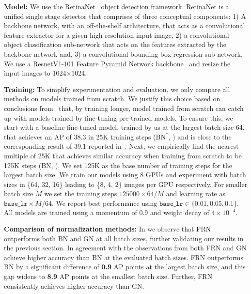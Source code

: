 \documentclass[10pt,twocolumn,letterpaper]{article}
\newcommand{\papername}{FRN}
\newcommand{\batchnorm}{BN}
\begin{document}
\medskip
\noindent
\textbf{Model:} We use the RetinaNet~\cite{lin2017focal} object detection framework. RetinaNet is a unified single stage detector that comprises of three conceptual components: 1) A backbone network, with an off-the-shelf architecture, that acts as a convolutional feature extractor for a given high resolution input image, 2) a convolutional object classification sub-network that acts on the features extracted by the backbone network and, 3) a convolutional bounding box regression sub-network.
We use a ResnetV1-101 Feature Pyramid Network backbone~\cite{lin2017feature} and resize the input images to 1024$\times$1024.



\medskip
\noindent
\textbf{Training:} To simplify experimentation and evaluation, we only compare all methods on models trained from scratch. We justify this choice based on conclusions from~\cite{he2019rethinking} that, by training longer, model trained from scratch can catch up with models trained by fine-tuning pre-trained models. To ensure this, we start with a baseline fine-tuned model, trained by us at the largest batch size 64, that achieves an AP of 38.3 in 25K training steps ($\text{BN}^*$, ) and is close to the corresponding result of 39.1 reported in~\cite{lin2017focal}. Next, we empirically find the nearest multiple of 25K that achieves similar accuracy when training from scratch to be 125K steps (BN, ). We set 125K as the base number of training steps for the largest batch size. We train our models using 8 GPUs and experiment with batch sizes in  \{64, 32, 16\} leading to \{8, 4, 2\} images per GPU  respectively. For smaller batch size $M$ we set the training steps $125000{\times}64/M$ and learning rate as $\texttt{base\_lr}{\times}M/64$. We report best performance using $\texttt{base\_lr} \in \{0.01, 0.05, 0.1\}$. All models are trained using a momentum of 0.9 and weight decay of $4{\times}10^{-4}$.

\medskip
\noindent
\textbf{Comparison of normalization methods:} In  we observe that \papername{} outperforms both \batchnorm{} and GN at all batch sizes, further validating our results in the previous section. In agreement with the observations from  both \papername{} and GN achieve higher accuracy than \batchnorm{} at the evaluated batch sizes. \papername{} outperforms \batchnorm{} by a significant difference of \textbf{0.9} AP points at the largest batch size, and this gap widens to \textbf{8.9} AP points at the smallest batch size. Further, \papername{} consistently achieves higher accuracy than GN.
\end{document}
